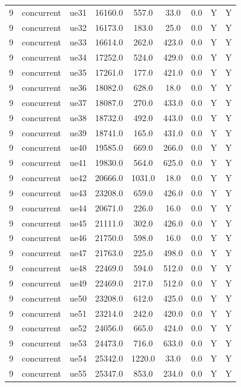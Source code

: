 \begin{table}[ht]
\begin{tabular}{|c|c|c|c|c|c|c|c|c|}
9 & concurrent & ue31 & 16160.0 & 557.0 & 33.0 & 0.0 & Y & Y \\
9 & concurrent & ue32 & 16173.0 & 183.0 & 25.0 & 0.0 & Y & Y \\
9 & concurrent & ue33 & 16614.0 & 262.0 & 423.0 & 0.0 & Y & Y \\
9 & concurrent & ue34 & 17252.0 & 524.0 & 429.0 & 0.0 & Y & Y \\
9 & concurrent & ue35 & 17261.0 & 177.0 & 421.0 & 0.0 & Y & Y \\
9 & concurrent & ue36 & 18082.0 & 628.0 & 18.0 & 0.0 & Y & Y \\
9 & concurrent & ue37 & 18087.0 & 270.0 & 433.0 & 0.0 & Y & Y \\
9 & concurrent & ue38 & 18732.0 & 492.0 & 443.0 & 0.0 & Y & Y \\
9 & concurrent & ue39 & 18741.0 & 165.0 & 431.0 & 0.0 & Y & Y \\
9 & concurrent & ue40 & 19585.0 & 669.0 & 266.0 & 0.0 & Y & Y \\
9 & concurrent & ue41 & 19830.0 & 564.0 & 625.0 & 0.0 & Y & Y \\
9 & concurrent & ue42 & 20666.0 & 1031.0 & 18.0 & 0.0 & Y & Y \\
9 & concurrent & ue43 & 23208.0 & 659.0 & 426.0 & 0.0 & Y & Y \\
9 & concurrent & ue44 & 20671.0 & 226.0 & 16.0 & 0.0 & Y & Y \\
9 & concurrent & ue45 & 21111.0 & 302.0 & 426.0 & 0.0 & Y & Y \\
9 & concurrent & ue46 & 21750.0 & 598.0 & 16.0 & 0.0 & Y & Y \\
9 & concurrent & ue47 & 21763.0 & 225.0 & 498.0 & 0.0 & Y & Y \\
9 & concurrent & ue48 & 22469.0 & 594.0 & 512.0 & 0.0 & Y & Y \\
9 & concurrent & ue49 & 22469.0 & 217.0 & 512.0 & 0.0 & Y & Y \\
9 & concurrent & ue50 & 23208.0 & 612.0 & 425.0 & 0.0 & Y & Y \\
9 & concurrent & ue51 & 23214.0 & 242.0 & 420.0 & 0.0 & Y & Y \\
9 & concurrent & ue52 & 24056.0 & 665.0 & 424.0 & 0.0 & Y & Y \\
9 & concurrent & ue53 & 24473.0 & 716.0 & 633.0 & 0.0 & Y & Y \\
9 & concurrent & ue54 & 25342.0 & 1220.0 & 33.0 & 0.0 & Y & Y \\
9 & concurrent & ue55 & 25347.0 & 853.0 & 234.0 & 0.0 & Y & Y \\

\end{tabular}
\end{table}

